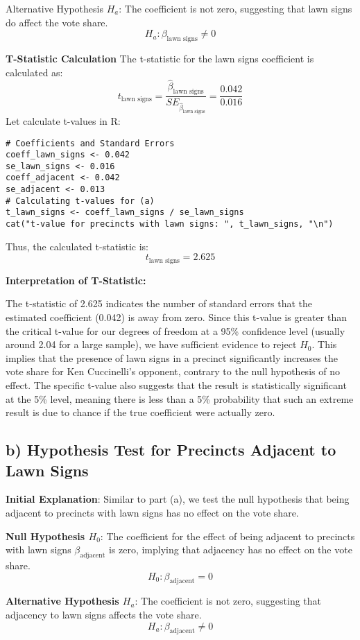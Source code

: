 \documentclass[12pt]{article}
\begin{document}
Alternative Hypothesis \( H_a \): The coefficient is not zero, suggesting that lawn signs do affect the vote share.
\[ H_a: \beta_{\text{lawn signs}} \neq 0 \]

\textbf{T-Statistic Calculation}
The t-statistic for the lawn signs coefficient is calculated as:
\[ t_{\text{lawn signs}} = \frac{\hat{\beta}_{\text{lawn signs}}}{SE_{\hat{\beta}_{\text{lawn signs}}}} = \frac{0.042}{0.016} \]
Let calculate t-values in R:
\begin{lstlisting}
# Coefficients and Standard Errors
coeff_lawn_signs <- 0.042
se_lawn_signs <- 0.016
coeff_adjacent <- 0.042
se_adjacent <- 0.013
# Calculating t-values for (a)
t_lawn_signs <- coeff_lawn_signs / se_lawn_signs
cat("t-value for precincts with lawn signs: ", t_lawn_signs, "\n")
\end{lstlisting}
Thus, the calculated t-statistic is:
\[ t_{\text{lawn signs}} = 2.625 \]


\textbf{Interpretation of T-Statistic:}

The t-statistic of 2.625 indicates the number of standard errors that the estimated coefficient (0.042) is away from zero. Since this t-value is greater than the critical t-value for our degrees of freedom at a 95\% confidence level (usually around 2.04 for a large sample), we have sufficient evidence to reject \( H_0 \). This implies that the presence of lawn signs in a precinct significantly increases the vote share for Ken Cuccinelli's opponent, contrary to the null hypothesis of no effect. The specific t-value also suggests that the result is statistically significant at the 5\% level, meaning there is less than a 5\% probability that such an extreme result is due to chance if the true coefficient were actually zero.




\subsection*{b) Hypothesis Test for Precincts Adjacent to Lawn Signs}
\textbf{Initial Explanation}: Similar to part (a), we test the null hypothesis that being adjacent to precincts with lawn signs has no effect on the vote share.

\textbf{Null Hypothesis \( H_0 \)}: The coefficient for the effect of being adjacent to precincts with lawn signs \( \beta_{\text{adjacent}} \) is zero, implying that adjacency has no effect on the vote share.
\[ H_0: \beta_{\text{adjacent}} = 0 \]

\textbf{Alternative Hypothesis \( H_a \)}: The coefficient is not zero, suggesting that adjacency to lawn signs affects the vote share.
\[ H_a: \beta_{\text{adjacent}} \neq 0 \]
\end{document}
